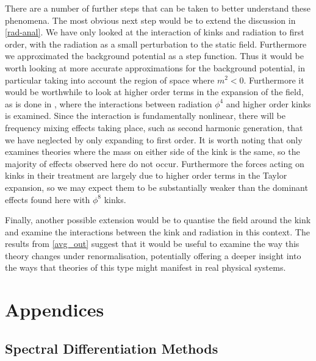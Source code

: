 \documentclass[11pt, oneside]{article}  	%
\numberwithin{equation}{section}
\begin{document}
There are a number of further steps that can be taken to better understand these phenomena. The most obvious next step would be to extend the discussion in \textsection \ref{rad-anal}. We have only looked at the interaction of kinks and radiation to first order, with the radiation as a small perturbation to the static field. Furthermore we approximated the background potential as a step function. Thus it would be worth looking at more accurate approximations for the background potential, in particular taking into account the region of space where $m^2 < 0$. Furthermore it would be worthwhile to look at higher order terms in the expansion of the field, as is done in \cite{rad_pressure}, where the interactions between radiation $\phi^4$ and higher order kinks is examined. Since the interaction is fundamentally nonlinear, there will be frequency mixing effects taking place, such as second harmonic generation, that we have neglected by only expanding to first order. It is worth noting that \cite{rad_pressure} only examines theories where the mass on either side of the kink is the same, so the majority of effects observed here do not occur. Furthermore the forces acting on kinks in their treatment are largely due to higher order terms in the Taylor expansion, so we may expect them to be substantially weaker than the dominant effects found here with $\phi^8$ kinks.\par
Finally, another possible extension would be to quantise the field around the kink and examine the interactions between the kink and radiation in this context. The results from \textsection \ref{avg_out} suggest that it would be useful to examine the way this theory changes under renormalisation, potentially offering a deeper insight into the ways that theories of this type might manifest in real physical systems.





 \renewcommand\thesection{}
 \renewcommand\thesubsection{\Alph{subsection}}
 \section{Appendices}
 \subsection{Spectral Differentiation Methods} \label{spectral}
\end{document}
